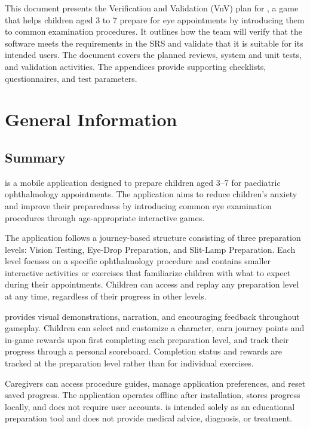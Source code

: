 \documentclass[10pt,titlepage]{article}
\begin{document}
\newpage


This document presents the Verification and Validation (VnV) plan for
\progname{}, a game that helps children aged 3 to 7 prepare for eye
appointments by introducing them to common examination procedures. It outlines
how the team will verify that the software meets the requirements in the SRS
and validate that it is suitable for its intended users. The document covers
the planned reviews, system and unit tests, and validation activities. The
appendices provide supporting checklists, questionnaires, and test parameters.

\section{General Information}\label{sec:section2}

\subsection{Summary}

\progname{} is a mobile application designed to prepare children aged 3--7
for paediatric ophthalmology appointments. The application aims to reduce
children's anxiety and improve their preparedness by introducing common
eye examination procedures through age-appropriate interactive games.

The application follows a journey-based structure consisting of three
preparation levels: Vision Testing, Eye-Drop Preparation, and Slit-Lamp
Preparation. Each level focuses on a specific ophthalmology procedure
and contains smaller interactive activities or exercises that familiarize
children with what to expect during their appointments. Children can
access and replay any preparation level at any time, regardless of their
progress in other levels.

\progname{} provides visual demonstrations, narration, and encouraging
feedback throughout gameplay. Children can select and customize a
character, earn journey points and in-game rewards upon first completing
each preparation level, and track their progress through a personal
scoreboard. Completion status and rewards are tracked at the preparation
level rather than for individual exercises.

Caregivers can access procedure guides, manage application preferences,
and reset saved progress. The application operates offline after
installation, stores progress locally, and does not require user
accounts. \progname{} is intended solely as an educational preparation
tool and does not provide medical advice, diagnosis, or treatment.
\end{document}
